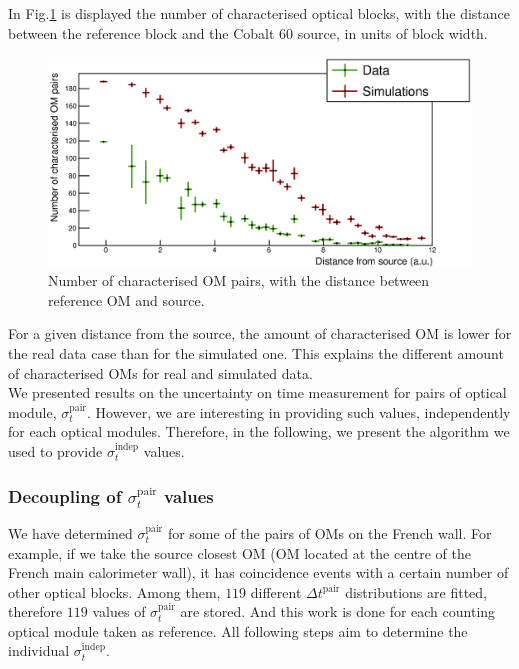 In Fig.\ref{fig:Co_sigma_distance} is displayed the number of characterised optical blocks, with the distance between the reference block and the Cobalt $60$ source, in units of block width.
\begin{figure}[h]
  \centering
  \includegraphics[width=15cm]{commissioning/fig_commissioning/Co_sigma_distance.eps}
  \caption{Number of characterised OM pairs, with the distance between reference OM and source.
    \label{fig:Co_sigma_distance}}
\end{figure}
For a given distance from the source, the amount of characterised OM is lower for the real data case than for the simulated one.
This explains the different amount of characterised OMs for real and simulated data.\\

We presented results on the uncertainty on time measurement for pairs of optical module, $\sigma_{t}^{\text{pair}}$.
However, we are interesting in providing such values, independently for each optical modules.
Therefore, in the following, we present the algorithm we used to provide $\sigma_{t}^{\text{indep}}$ values.




\subsubsection*{Decoupling of $\sigma_{t}^{\text{pair}}$ values}

We have determined $\sigma_{t}^{\text{pair}}$ for some of the pairs of OMs on the French wall.
For example, if we take the source closest OM (OM located at the centre of the French main calorimeter wall), it has coincidence events with a certain number of other optical blocks.
Among them, $119$ different $\Delta t^{\text{pair}}$ distributions are fitted, therefore $119$ values of $\sigma_{t}^{\text{pair}}$ are stored.
And this work is done for each counting optical module taken as reference.
All following steps aim to determine the individual $\sigma_{t}^{\text{indep}}$.

